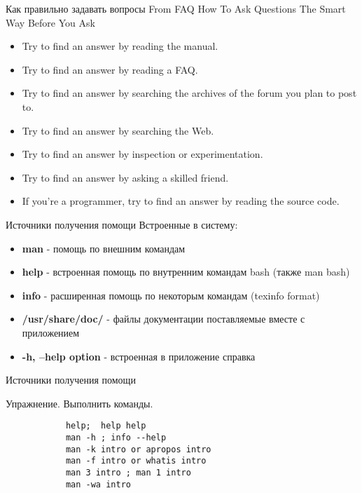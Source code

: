 \begin{frame}[fragile]{Как правильно задавать вопросы}
From FAQ How To Ask Questions The Smart Way
Before You Ask
  \begin{itemize}
	  \item Try to find an answer by reading the manual.
	  \item Try to find an answer by reading a FAQ.
	  \item Try to find an answer by searching the archives of the forum you plan to post to.
	  \item Try to find an answer by searching the Web.
	  \item Try to find an answer by inspection or experimentation.
	  \item Try to find an answer by asking a skilled friend.
	  \item If you're a programmer, try to find an answer by reading the source code.
    \end{itemize}
\end{frame}


\begin{frame}[fragile]{Источники получения помощи}
    Встроенные в систему:
\begin{itemize}
    \item \textbf{man} - помощь по внешним командам
    \pause
    \item \textbf{help} - встроенная помощь по внутренним командам bash (также man bash)
    \pause
    \item \textbf{info} - расширенная помощь по некоторым командам (texinfo format)
    \item \textbf{/usr/share/doc/} - файлы документации поставляемые вместе с приложением
    \item \textbf{-h, --help option} - встроенная в приложение справка
\end{itemize}
\end{frame}

\begin{frame}[fragile]{Источники получения помощи}
     \begin{block}{Упражнение. Выполнить команды.}
        \begin{lstlisting}
            help;  help help
            man -h ; info --help
            man -k intro or apropos intro
            man -f intro or whatis intro
            man 3 intro ; man 1 intro
            man -wa intro
        \end{lstlisting}
    \end{block}
\end{frame}

